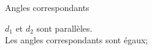 \documentclass[12pt]{article}
\begin{document}
\begin{multicols}{2}
  \begin{Definition}{Angles correspondants}\\
  \end{Definition}

  \begin{Proposition}{$d_1$ et $d_2$ sont parallèles.}\\
    Les angles correspondants sont égaux;
  \end{Proposition}
\end{multicols}
\end{document}
